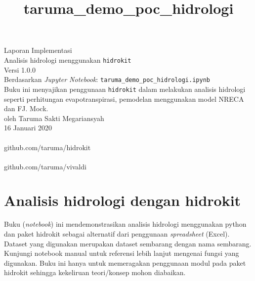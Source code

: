 \documentclass[11pt]{article}
\title{taruma\_demo\_poc\_hidrologi}
\let\oldsection\section
\renewcommand\section{\clearpage\oldsection}
\begin{document}
   
	\begin{titlepage}
		\vspace*{\fill}
		\begin{center}
 		\normalsize Laporan Implementasi \\
		\huge Analisis hidrologi menggunakan \texttt{hidrokit}\\ 
		\normalsize Versi 1.0.0 \\[0.2cm]
      	\small Berdasarkan \emph{Jupyter Notebook}: \texttt{taruma\_demo\_poc\_hidrologi.ipynb} \\[0.5cm]
      	\normalsize Buku ini menyajikan penggunaan \texttt{hidrokit} dalam melakukan analisis hidrologi seperti perhitungan evapotranspirasi, pemodelan menggunakan model NRECA dan FJ. Mock. \\[0.5cm]
		\normalsize oleh Taruma Sakti Megariansyah\\[0.5cm]
      	\normalsize 16 Januari 2020\\[1cm]
    	\\
      	\normalsize github.com/taruma/hidrokit \\[0.5cm]
      	\\
      	\normalsize github.com/taruma/vivaldi
		\end{center}
    	\vspace*{\fill}
	\end{titlepage}
    
    

    
    \hypertarget{analisis-hidrologi-dengan-hidrokit}{%
\section{Analisis hidrologi dengan
hidrokit}\label{analisis-hidrologi-dengan-hidrokit}}

Buku (\emph{notebook}) ini mendemonstrasikan analisis hidrologi
menggunakan python dan paket hidrokit sebagai alternatif dari penggunaan
\emph{spreadsheet} (Excel). Dataset yang digunakan merupakan dataset
sembarang dengan nama sembarang. Kunjungi notebook manual untuk
referensi lebih lanjut mengenai fungsi yang digunakan. Buku ini hanya
untuk memeragakan penggunaan modul pada paket hidrokit sehingga
kekeliruan teori/konsep mohon diabaikan.
\end{document}
